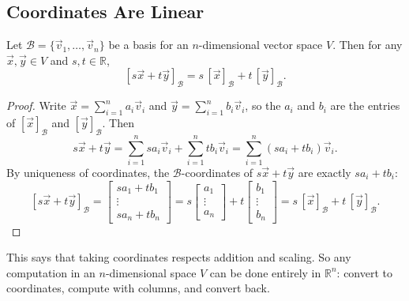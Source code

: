 \subsection{Coordinates Are Linear}

\begin{theorem}\label{thm:L4-linear}
Let $\mathcal{B} = \{\vec{v}_1, \dots, \vec{v}_n\}$ be a basis for an $n$-dimensional vector space $V$. Then for any $\vec{x}, \vec{y} \in V$ and $s, t \in \mathbb{R}$,
\[
[s\vec{x} + t\vec{y}]_{\mathcal{B}} = s\,[\vec{x}]_{\mathcal{B}} + t\,[\vec{y}]_{\mathcal{B}}.
\]
\end{theorem}

\begin{proof}
Write $\vec{x} = \sum_{i=1}^n a_i\vec{v}_i$ and $\vec{y} = \sum_{i=1}^n b_i\vec{v}_i$, so the $a_i$ and $b_i$ are the entries of $[\vec{x}]_{\mathcal{B}}$ and $[\vec{y}]_{\mathcal{B}}$. Then
\[
s\vec{x} + t\vec{y} = \sum_{i=1}^n sa_i\vec{v}_i + \sum_{i=1}^n tb_i\vec{v}_i = \sum_{i=1}^n (sa_i + tb_i)\vec{v}_i.
\]
By uniqueness of coordinates, the $\mathcal{B}$-coordinates of $s\vec{x} + t\vec{y}$ are exactly $sa_i + tb_i$:
\[
[s\vec{x} + t\vec{y}]_{\mathcal{B}} = \begin{bmatrix} sa_1 + tb_1 \\ \vdots \\ sa_n + tb_n \end{bmatrix} = s\begin{bmatrix} a_1 \\ \vdots \\ a_n \end{bmatrix} + t\begin{bmatrix} b_1 \\ \vdots \\ b_n \end{bmatrix} = s\,[\vec{x}]_{\mathcal{B}} + t\,[\vec{y}]_{\mathcal{B}}.
\]
\end{proof}

\begin{remark}
This says that taking coordinates respects addition and scaling. So any computation in an $n$-dimensional space $V$ can be done entirely in $\mathbb{R}^n$: convert to coordinates, compute with columns, and convert back.
\end{remark}

